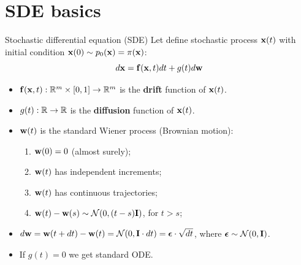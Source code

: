 \section{SDE basics}
\begin{frame}{Stochastic differential equation (SDE)}
	Let define stochastic process $\mathbf{x}(t)$ with initial condition $\mathbf{x}(0) \sim p_0(\mathbf{x}) = \pi(\mathbf{x})$:
	\[
		d\mathbf{x} = \mathbf{f}(\mathbf{x}, t) dt + g(t) d \mathbf{w}
	\]
	\vspace{-0.5cm}
	\begin{itemize}
		 \item $\mathbf{f}(\mathbf{x}, t): \mathbb{R}^m \times [0, 1] \rightarrow \mathbb{R}^m$ is the \textbf{drift} function of $\mathbf{x}(t)$.
		 \item $g(t): \mathbb{R} \rightarrow \mathbb{R}$ is the \textbf{diffusion} function of $\mathbf{x}(t)$.
		 \item $\mathbf{w}(t)$ is the standard Wiener process (Brownian motion):
		 \begin{enumerate}
		 	\item $\mathbf{w}(0) = 0$ (almost surely);
		 	\item $\mathbf{w}(t)$ has independent increments;
		 	\item $\mathbf{w}(t)$ has continuous trajectories;
			 \item $\mathbf{w}(t) - \mathbf{w}(s) \sim \mathcal{N}(0, (t - s) \mathbf{I})$, for $t > s$;
		 \end{enumerate}
		 \item $d \mathbf{w} = \mathbf{w}(t + dt) - \mathbf{w}(t) = \mathcal{N}(0, \mathbf{I} \cdot dt ) = \boldsymbol{\epsilon} \cdot \sqrt{dt}$, where $\boldsymbol{\epsilon} \sim \mathcal{N}(0, \mathbf{I})$.
		 \item If $g(t) = 0$ we get standard ODE.
	\end{itemize}
\end{frame}
